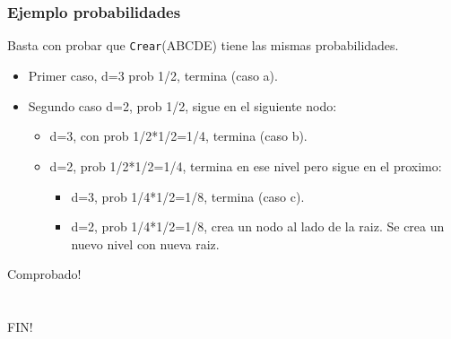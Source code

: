 \documentclass[10pt,handout]{beamer}
\begin{document}
\section{}
\begin{frame}
\frametitle{Ejemplo probabilidades}

Basta con probar que \texttt{Crear}(ABCDE) tiene las mismas probabilidades.

\begin{itemize}
  \item Primer caso, d=3 prob 1/2, termina (caso a). \pause
  \item Segundo caso d=2, prob 1/2, sigue en el siguiente nodo:
    \begin{itemize}\pause
      \item d=3, con prob 1/2*1/2=1/4, termina (caso b).\pause
      \item d=2, prob 1/2*1/2=1/4, termina en ese nivel pero sigue en el proximo:
        \begin{itemize}\pause
          \item d=3, prob 1/4*1/2=1/8, termina (caso c).\pause
          \item d=2, prob 1/4*1/2=1/8, crea un nodo al lado de la raiz. Se crea
            un nuevo nivel con nueva raiz.
        \end{itemize}
    \end{itemize}
\end{itemize}

\pause

Comprobado!

\end{frame}


\section{}
\begin{frame}
\frametitle{}

\huge
\centering
FIN!
\end{frame}

\end{document}
